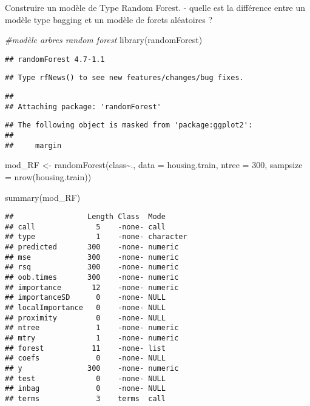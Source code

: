 \documentclass[
]{article}
\newenvironment{Shaded}{\begin{snugshade}}{\end{snugshade}}
\newcommand{\AttributeTok}[1]{\textcolor[rgb]{0.77,0.63,0.00}{#1}}
\newcommand{\CommentTok}[1]{\textcolor[rgb]{0.56,0.35,0.01}{\textit{#1}}}
\newcommand{\DecValTok}[1]{\textcolor[rgb]{0.00,0.00,0.81}{#1}}
\newcommand{\FunctionTok}[1]{\textcolor[rgb]{0.00,0.00,0.00}{#1}}
\newcommand{\NormalTok}[1]{#1}
\newcommand{\OtherTok}[1]{\textcolor[rgb]{0.56,0.35,0.01}{#1}}
\newcommand{\SpecialCharTok}[1]{\textcolor[rgb]{0.00,0.00,0.00}{#1}}
\begin{document}
Construire un modèle de Type Random Forest. - quelle est la différence
entre un modèle type bagging et un modèle de forets aléatoires ?

\begin{Shaded}
\begin{Highlighting}[]
\CommentTok{\#modèle arbres random forest}
\FunctionTok{library}\NormalTok{(randomForest)}
\end{Highlighting}
\end{Shaded}

\begin{verbatim}
## randomForest 4.7-1.1
\end{verbatim}

\begin{verbatim}
## Type rfNews() to see new features/changes/bug fixes.
\end{verbatim}

\begin{verbatim}
## 
## Attaching package: 'randomForest'
\end{verbatim}

\begin{verbatim}
## The following object is masked from 'package:ggplot2':
## 
##     margin
\end{verbatim}

\begin{Shaded}
\begin{Highlighting}[]
\NormalTok{mod\_RF }\OtherTok{\textless{}{-}} \FunctionTok{randomForest}\NormalTok{(class}\SpecialCharTok{\textasciitilde{}}\NormalTok{., }\AttributeTok{data =}\NormalTok{ housing.train, }\AttributeTok{ntree =} \DecValTok{300}\NormalTok{, }\AttributeTok{sampsize =} \FunctionTok{nrow}\NormalTok{(housing.train))}

\FunctionTok{summary}\NormalTok{(mod\_RF)}
\end{Highlighting}
\end{Shaded}

\begin{verbatim}
##                 Length Class  Mode     
## call              5    -none- call     
## type              1    -none- character
## predicted       300    -none- numeric  
## mse             300    -none- numeric  
## rsq             300    -none- numeric  
## oob.times       300    -none- numeric  
## importance       12    -none- numeric  
## importanceSD      0    -none- NULL     
## localImportance   0    -none- NULL     
## proximity         0    -none- NULL     
## ntree             1    -none- numeric  
## mtry              1    -none- numeric  
## forest           11    -none- list     
## coefs             0    -none- NULL     
## y               300    -none- numeric  
## test              0    -none- NULL     
## inbag             0    -none- NULL     
## terms             3    terms  call
\end{verbatim}
\end{document}
